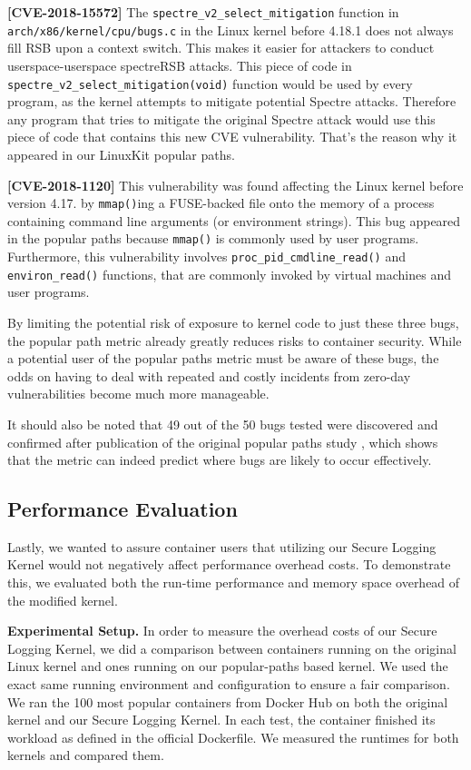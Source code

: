\textbf{[CVE-2018-15572]}
The \verb|spectre_v2_select_mitigation| function in \verb|arch/x86/kernel/cpu/bugs.c| in the Linux kernel before 4.18.1 does not always fill RSB upon a context switch. 
This makes it easier for attackers to conduct userspace-userspace spectreRSB attacks. 
This piece of code in \\
\verb|spectre_v2_select_mitigation(void)| function would be used by every program, as the kernel attempts to mitigate potential Spectre attacks. 
Therefore any program that tries to mitigate the original Spectre attack would use this piece of code that contains this new CVE vulnerability. 
That's the reason why it appeared in our LinuxKit popular paths. 

\textbf{[CVE-2018-1120]}
This vulnerability was found affecting the Linux kernel before version 4.17. by \verb|mmap()|ing a FUSE-backed file onto 
the memory of a process containing command line arguments (or environment strings). 
This bug appeared in the popular paths because \verb|mmap()| is commonly used by user programs. 
Furthermore, this vulnerability involves \verb|proc_pid_cmdline_read()| and \verb|environ_read()| functions, that are commonly invoked by virtual machines and user programs.

By limiting the potential risk of exposure to kernel code to just these three bugs, the popular path metric already greatly reduces risks to container security. 
While a potential user of the popular paths metric must be aware of these bugs, 
the odds on having to deal with repeated and costly incidents from zero-day vulnerabilities become much more manageable.  

It should also be noted that 49 out of the 50 bugs tested were discovered and confirmed after publication of the original popular paths study \cite{Lock-in-Pop}, 
which shows that the metric can indeed predict where bugs are likely to occur effectively. 

\subsection{Performance Evaluation}
\label{sec.evaluation.performance} 
Lastly, we wanted to assure container users that utilizing our Secure Logging Kernel  would not negatively affect performance overhead costs. 
To demonstrate this, we evaluated both the run-time performance and memory space overhead of the modified kernel.

\textbf{Experimental Setup.}
In order to measure the overhead costs of our Secure Logging Kernel, 
we did a comparison between containers running on the original Linux kernel and ones running on our popular-paths based kernel. 
We used the exact same running environment and configuration to ensure a fair comparison. 
We ran the 100 most popular containers from Docker Hub on both the original kernel and our Secure Logging Kernel. 
In each test, the container finished its workload as defined in the official Dockerfile. We measured the runtimes for both kernels and compared them. 

